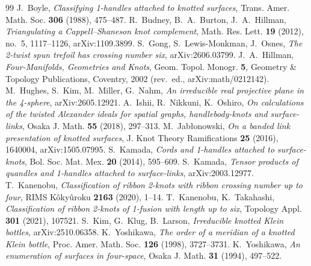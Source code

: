 \documentclass[11pt]{amsart}
\theoremstyle{plain}
\theoremstyle{remark}
\begin{document}
\begin{thebibliography}{99}
 J.~Boyle, \emph{Classifying 1-handles attached to knotted surfaces}, Trans. Amer. Math. Soc.
\textbf{306} (1988), 475--487.
 R.~Budney, B.~A.~Burton, J.~A.~Hillman, \emph{Triangulating a Cappell--Shaneson knot complement},
Math. Res. Lett. \textbf{19} (2012), no.~5, 1117--1126, arXiv:1109.3899.
 S.~Gong, S.~Lewis-Monkman, J.~Osnes, \emph{The 2-twist spun trefoil has crossing number six},
arXiv:2606.03799.
 J.~A.~Hillman, \emph{Four-Manifolds, Geometries and Knots}, Geom. Topol. Monogr. \textbf{5},
Geometry \& Topology Publications, Coventry, 2002 (rev.\ ed., arXiv:math/0212142).
 M.~Hughes, S.~Kim, M.~Miller, G.~Nahm, \emph{An irreducible real projective plane in the
4-sphere}, arXiv:2605.12921.
 A.~Ishii, R.~Nikkuni, K.~Oshiro, \emph{On calculations of the twisted Alexander ideals for
spatial graphs, handlebody-knots and surface-links}, Osaka J. Math. \textbf{55} (2018), 297--313.
 M.~Jab\l{}onowski, \emph{On a banded link presentation of knotted surfaces}, J. Knot Theory
Ramifications \textbf{25} (2016), 1640004, arXiv:1505.07995.
 S.~Kamada, \emph{Cords and 1-handles attached to surface-knots}, Bol. Soc. Mat. Mex.
\textbf{20} (2014), 595--609.
 S.~Kamada, \emph{Tensor products of quandles and 1-handles attached to surface-links},
arXiv:2003.12977.
 T.~Kanenobu, \emph{Classification of ribbon 2-knots with ribbon crossing number up to four},
RIMS K\^oky\^uroku \textbf{2163} (2020), 1--14.
 T.~Kanenobu, K.~Takahashi, \emph{Classification of ribbon 2-knots of 1-fusion with length up
to six}, Topology Appl. \textbf{301} (2021), 107521.
 S.~Kim, G.~Klug, B.~Larson, \emph{Irreducible knotted Klein bottles}, arXiv:2510.06358.
 K.~Yoshikawa, \emph{The order of a meridian of a knotted Klein bottle}, Proc. Amer. Math. Soc.
\textbf{126} (1998), 3727--3731.
 K.~Yoshikawa, \emph{An enumeration of surfaces in four-space}, Osaka J. Math. \textbf{31}
(1994), 497--522.
\end{thebibliography}
\end{document}
